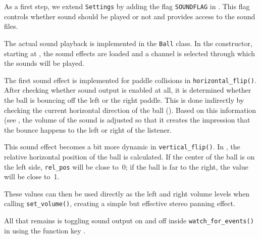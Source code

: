 As a first step, we extend \texttt{Settings} by adding the flag \texttt{SOUNDFLAG} in . This flag controls whether sound should be played or not and provides access to the sound files.


The actual sound playback is implemented in the \texttt{Ball} class. In the constructor, starting at , the sound effects are loaded and a channel is selected through which the sounds will be played.


 The first sound effect is implemented for paddle collisions in \texttt{horizontal\_flip()}. After checking whether sound output is enabled at all, it is determined whether the ball is bouncing off the left or the right paddle. This is done indirectly by checking the current horizontal direction of the ball (). Based on this information (see , the volume of the sound is adjusted so that it creates the impression that the bounce happens to the left or right of the listener.


This sound effect becomes a bit more dynamic in \texttt{vertical\_flip()}. In , the relative horizontal position of the ball is calculated. If the center of the ball is on the left side, \texttt{rel\_pos} will be close to~0; if the ball is far to the right, the value will be close to~1.  

These values can then be used directly as the left and right volume levels when calling \texttt{set\_volume()}, creating a simple but effective stereo panning effect.


All that remains is toggling sound output on and off inside \texttt{watch\_for\_events()} in  using the function key .


